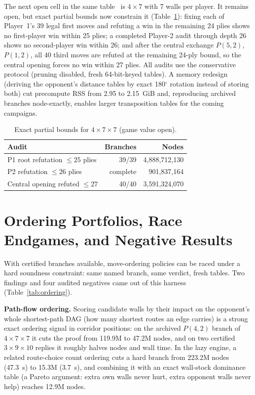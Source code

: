 \documentclass[conference]{IEEEtran}
\newcommand{\varSpec}[3]{$#1{\times}#2{\times}#3$}
\begin{document}
The next open cell in the same table~\cite{slatton2026solving} is $4\times 7$ with 7 walls per player. It remains open, but exact partial bounds now constrain it (Table~\ref{tab:fourseven}): fixing each of Player~1's 39 legal first moves and refuting a win in the remaining 24 plies shows no first-player win within 25 plies; a completed Player-2 audit through depth 26 shows no second-player win within 26; and after the central exchange $P(5,2)$, $P(1,2)$, all 40 third moves are refuted at the remaining 24-ply bound, so the central opening forces no win within 27 plies. All audits use the conservative protocol (pruning disabled, fresh 64-bit-keyed tables). A memory redesign (deriving the opponent's distance tables by exact 180$^\circ$ rotation instead of storing both) cut precompute RSS from 2.95 to 2.15~GiB and, reproducing archived branches node-exactly, enables larger transposition tables for the coming campaigns.

\begin{table}[t]
\centering
\caption{Exact partial bounds for \varSpec{4}{7}{7} (game value open).}
\label{tab:fourseven}
\begin{tabular}{lrr}
\toprule
Audit & Branches & Nodes \\
\midrule
P1 root refutation $\leq 25$ plies & 39/39 & 4{,}888{,}712{,}130 \\
P2 refutation $\leq 26$ plies & complete & 901{,}837{,}164 \\
Central opening refuted $\leq 27$ & 40/40 & 3{,}591{,}324{,}070 \\
\bottomrule
\end{tabular}
\end{table}

\section{Ordering Portfolios, Race Endgames, and Negative Results}
\label{sec:ordering}

With certified branches available, move-ordering policies can be raced under a hard soundness constraint: same named branch, same verdict, fresh tables. Two findings and four audited negatives came out of this harness (Table~\ref{tab:ordering}).

\textbf{Path-flow ordering.} Scoring candidate walls by their impact on the opponent's whole shortest-path DAG (how many shortest routes an edge carries) is a strong exact ordering signal in corridor positions: on the archived $P(4,2)$ branch of \varSpec{4}{7}{7} it cuts the proof from 119.9M to 47.2M nodes, and on two certified \varSpec{3}{9}{10} replies it roughly halves nodes and wall time. In the lazy engine, a related route-choice count ordering cuts a hard branch from 223.2M nodes (47.3~s) to 15.3M (3.7~s), and combining it with an exact wall-stock dominance table (a Pareto argument: extra own walls never hurt, extra opponent walls never help) reaches 12.9M nodes.
\end{document}

